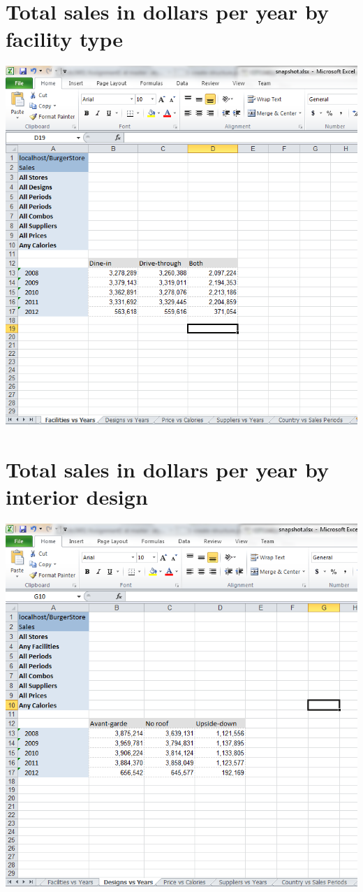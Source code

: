 \documentclass[12pt, a4paper]{article}
\begin{document}
\section{Total sales in dollars per year by facility type} 
\includegraphics{diagrams/FacilitiesVsYears}

\section{Total sales in dollars per year by interior design}
\includegraphics{diagrams/DesignsVsYears}
\end{document}
